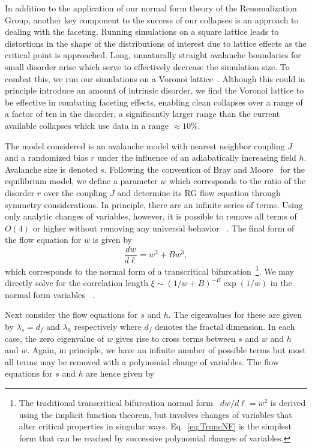 \documentclass[reprint,amsmath,amssymb,aps,floatfix, prl]{revtex4-1}
\begin{document}
%
In addition to the application of our normal form theory of the Renomalization Group, another key component to the success of our collapses is an approach to dealing with the faceting. Running simulations on a square lattice leads to distortions in the shape of the distributions of interest due to lattice effects as the critical point is approached. Long, unnaturally straight avalanche boundaries for small disorder arise which serve to effectively decrease the simulation size. To combat this, we run our simulations on a Voronoi lattice~\cite{RFIM2Dsupp}.  Although this could in principle introduce an amount of intrinsic disorder, we find the Voronoi lattice to be effective in combating faceting effects, enabling clean collapses over a range of a factor of ten in the disorder, a significantly larger range than the current available collapses which use data in a range $\approx 10\%$.\par
%
The model considered is an avalanche model with nearest neighbor coupling $J$ and a randomized bias $r$ under the influence of an adiabatically increasing field $h$. Avalanche size is denoted $s$. Following the convention of Bray and Moore~\cite{BrayMoore85} for the equilibrium model, we define a parameter $w$ which corresponds to the ratio of the disorder $r$ over the coupling $J$ and determine its RG flow equation through symmetry considerations. In principle, there are an infinite series of terms. Using only analytic changes of variables, however, it is possible to remove all terms of $O(4)$ or higher without removing any universal behavior ~\cite{RFIM2Dsupp}. The final form of the flow equation for $w$ is given by 
%
\begin{equation}
	\label{eq:TruncNF}
	\frac{dw}{d\ell}=w^2+B w^3 ,
\end{equation}
\noindent which corresponds to the normal form of a transcritical bifurcation~\footnote{The traditional transcritical bifurcation normal form~\cite{Strogatz14} $dw/d\ell = w^2$ is derived using the implicit function theorem, but involves changes of variables that alter critical properties in singular ways. Eq.~\ref{eq:TruncNF} is the simplest form that can be reached by successive polynomial changes of variables.}. We may directly solve for the correlation length $\xi\sim(1/w + B)^{-B}\exp(1/w)$ in the normal form variables ~\cite{RFIM2Dsupp}.\par
%
Next consider the flow equations for $s$ and $h$. The eigenvalues for these are given by $\lambda_s=d_f$ and $\lambda_h$ respectively where $d_f$ denotes the fractal dimension. In each case, the zero eigenvalue of $w$ gives rise to cross terms between $s$ and $w$ and $h$ and $w$. Again, in principle, we have an infinite number of possible terms but most all terms may be removed with a polynomial change of variables.   The flow equations for $s$ and $h$ are hence given by
\end{document}

